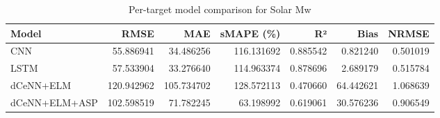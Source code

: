 \begin{table}
\caption{Per-target model comparison for Solar Mw}
\begin{tabular}{lrrrrrr}
\toprule
Model & RMSE & MAE & sMAPE (\%) & R² & Bias & NRMSE \\
\midrule
CNN & 55.886941 & 34.486256 & 116.131692 & 0.885542 & 0.821240 & 0.501019 \\
LSTM & 57.533904 & 33.276640 & 114.963374 & 0.878696 & 2.689179 & 0.515784 \\
dCeNN+ELM & 120.942962 & 105.734702 & 128.572113 & 0.470660 & 64.442621 & 1.068639 \\
dCeNN+ELM+ASP & 102.598519 & 71.782245 & 63.198992 & 0.619061 & 30.576236 & 0.906549 \\
\bottomrule
\end{tabular}
\end{table}
